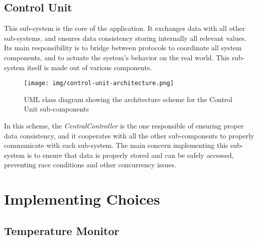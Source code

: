 \documentclass[a4paper,12pt]{report}
\begin{document}
	\section{Control Unit}
	This sub-system is the core of the application. It exchanges data with all other sub-systems, and ensures data consistency storing internally all relevant values. Its main responsibility is to bridge between protocols to coordinate all system components, and to actuate the system's behavior on the real world.
	\newline This sub-system itself is made out of various components.
	\begin{figure}[H]
		\centering{}
		\texttt{[image: img/control-unit-architecture.png]}
		\caption{UML class diagram showing the architecture scheme for the Control Unit sub-components}
		\label{img:control-unit-architecture}
	\end{figure}
	In this scheme, the \textit{CentralController} is the one responsible of ensuring proper data consistency, and it cooperates with all the other sub-components to properly communicate with each sub-system.
	\newline The main concern implementing this sub-system is to ensure that data is properly stored and can be safely accessed, preventing race conditions and other concurrency issues.
	
	\chapter{Implementing Choices}
	\section{Temperature Monitor}
\end{document}
